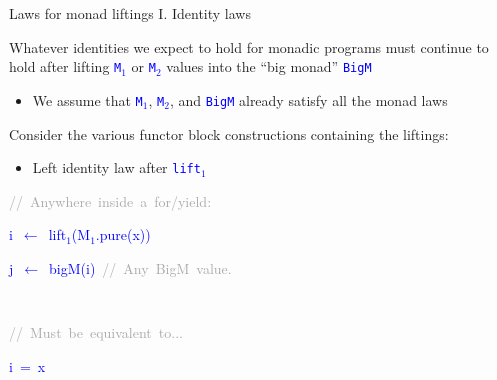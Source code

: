 \documentclass[english]{beamer}
\newenvironment{lyxcode}
  {\par\begin{list}{}{
    \setlength{\rightmargin}{\leftmargin}
    \setlength{\listparindent}{0pt}%
    \raggedright
    \setlength{\itemsep}{0pt}
    \setlength{\parsep}{0pt}
    \normalfont\ttfamily}%
   \def\{{\char`\{}
   \def\}{\char`\}}
   \def\textasciitilde{\char`\~}
   \item[]}
  {\end{list}}
\begin{document}
\begin{frame}{Laws for monad liftings I. Identity laws}

Whatever identities we expect to hold for monadic programs must continue
to hold after lifting \texttt{\textcolor{blue}{\footnotesize{}M$_{1}$}}
or \texttt{\textcolor{blue}{\footnotesize{}M$_{2}$}} values into
the ``big monad'' \texttt{\textcolor{blue}{\footnotesize{}BigM}} 
\begin{itemize}
\item We assume that \texttt{\textcolor{blue}{\footnotesize{}M$_{1}$}},
\texttt{\textcolor{blue}{\footnotesize{}M$_{2}$}}, and \texttt{\textcolor{blue}{\footnotesize{}BigM}}
already satisfy all the monad laws
\end{itemize}
Consider the various functor block constructions containing the liftings:
\begin{itemize}
\item Left identity law after \texttt{\textcolor{blue}{\footnotesize{}lift$_{1}$}} 
\end{itemize}
{\footnotesize{}\vspace{-0.3cm}\hspace{-0.0cm}}\texttt{\textcolor{blue}{\footnotesize{}}}%
\begin{minipage}[t]{0.54\columnwidth}%
\begin{lyxcode}
\textrm{\textcolor{darkgray}{\footnotesize{}//~Anywhere~inside~a~for/yield:}}{\footnotesize\par}

\textcolor{blue}{\footnotesize{}i~$\leftarrow$~lift$_{1}$(M$_{1}$.pure(x))}{\footnotesize\par}

\textcolor{blue}{\footnotesize{}j~$\leftarrow$~bigM(i)~}\textrm{\textcolor{darkgray}{\footnotesize{}//~Any~BigM~value.}}{\footnotesize\par}
\end{lyxcode}
%
\end{minipage}\texttt{\textcolor{blue}{\footnotesize{}~ }}%
\begin{minipage}[t]{0.54\columnwidth}%
\begin{lyxcode}
\textrm{\textcolor{darkgray}{\footnotesize{}//~Must~be~equivalent~to...}}{\footnotesize\par}

\textcolor{blue}{\footnotesize{}i~=~x}{\footnotesize\par}


\end{lyxcode}
\end{minipage}
\end{frame}
\end{document}

